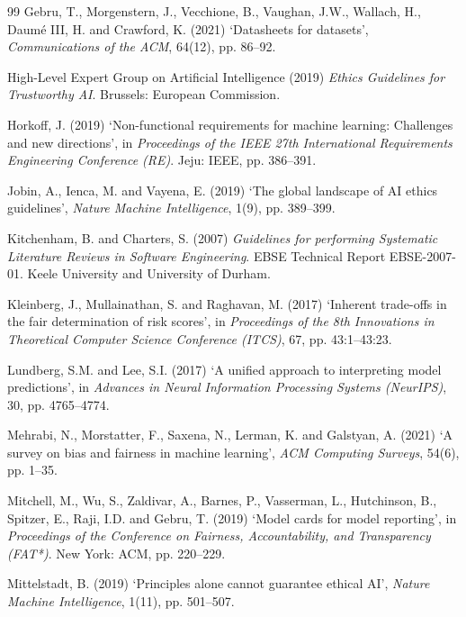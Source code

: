 \documentclass[11pt,a4paper]{article}
\begin{document}
\begin{thebibliography}{99}
Gebru, T., Morgenstern, J., Vecchione, B., Vaughan, J.W., Wallach, H., Daum\'{e} III, H. and Crawford, K. (2021) `Datasheets for datasets', \textit{Communications of the ACM}, 64(12), pp. 86--92.

High-Level Expert Group on Artificial Intelligence (2019) \textit{Ethics Guidelines for Trustworthy AI}. Brussels: European Commission.

Horkoff, J. (2019) `Non-functional requirements for machine learning: Challenges and new directions', in \textit{Proceedings of the IEEE 27th International Requirements Engineering Conference (RE)}. Jeju: IEEE, pp. 386--391.

Jobin, A., Ienca, M. and Vayena, E. (2019) `The global landscape of AI ethics guidelines', \textit{Nature Machine Intelligence}, 1(9), pp. 389--399.

Kitchenham, B. and Charters, S. (2007) \textit{Guidelines for performing Systematic Literature Reviews in Software Engineering}. EBSE Technical Report EBSE-2007-01. Keele University and University of Durham.

Kleinberg, J., Mullainathan, S. and Raghavan, M. (2017) `Inherent trade-offs in the fair determination of risk scores', in \textit{Proceedings of the 8th Innovations in Theoretical Computer Science Conference (ITCS)}, 67, pp. 43:1--43:23.

Lundberg, S.M. and Lee, S.I. (2017) `A unified approach to interpreting model predictions', in \textit{Advances in Neural Information Processing Systems (NeurIPS)}, 30, pp. 4765--4774.

Mehrabi, N., Morstatter, F., Saxena, N., Lerman, K. and Galstyan, A. (2021) `A survey on bias and fairness in machine learning', \textit{ACM Computing Surveys}, 54(6), pp. 1--35.

Mitchell, M., Wu, S., Zaldivar, A., Barnes, P., Vasserman, L., Hutchinson, B., Spitzer, E., Raji, I.D. and Gebru, T. (2019) `Model cards for model reporting', in \textit{Proceedings of the Conference on Fairness, Accountability, and Transparency (FAT*)}. New York: ACM, pp. 220--229.

Mittelstadt, B. (2019) `Principles alone cannot guarantee ethical AI', \textit{Nature Machine Intelligence}, 1(11), pp. 501--507.


\end{thebibliography}
\end{document}
